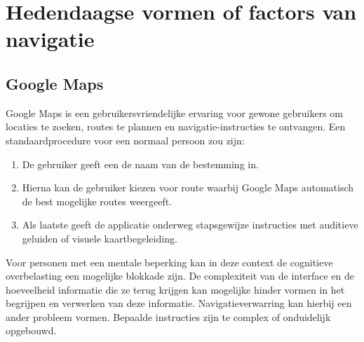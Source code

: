 
\section{Hedendaagse vormen of factors van navigatie}
\label{sec:literatuuroverzicht}


\subsection{Google Maps}
\label{sec:google-maps}


Google Maps is een gebruikersvriendelijke ervaring voor gewone gebruikers om locaties te zoeken, routes te plannen en navigatie-instructies te ontvangen. Een standaardprocedure voor een normaal persoon zou zijn:

\begin{enumerate}
    \item De gebruiker geeft een de naam van de bestemming in.
    \item Hierna kan de gebruiker kiezen voor route waarbij Google Maps automatisch de best mogelijke routes weergeeft.
    \item Als laatste geeft de applicatie onderweg stapsgewijze instructies met auditieve geluiden of visuele kaartbegeleiding.
\end{enumerate}

Voor personen met een mentale beperking kan in deze context de cognitieve overbelasting een mogelijke blokkade zijn. De complexiteit van de interface en de hoeveelheid informatie die ze terug krijgen kan mogelijke hinder vormen in het begrijpen en verwerken van deze informatie. Navigatieverwarring kan hierbij een ander probleem vormen. Bepaalde instructies zijn te complex of onduidelijk opgebouwd.

